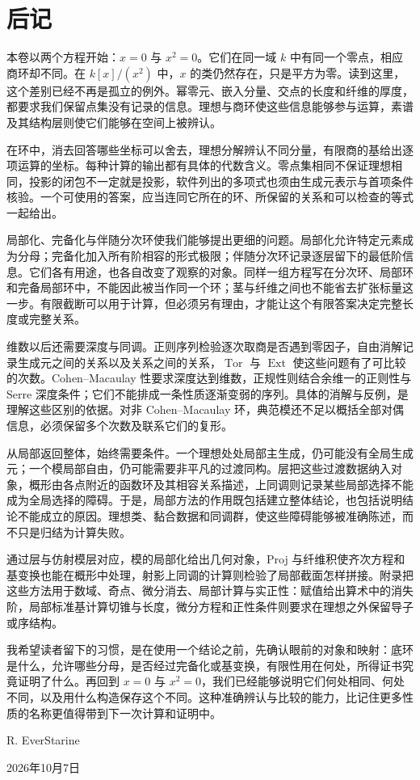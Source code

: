 \chapter*{后记}

本卷以两个方程开始：\(x=0\) 与 \(x^2=0\)。它们在同一域 \(k\) 中有同一个零点，相应商环却不同。在 \(k[x]/(x^2)\) 中，\(x\) 的类仍然存在，只是平方为零。读到这里，这个差别已经不再是孤立的例外。幂零元、嵌入分量、交点的长度和纤维的厚度，都要求我们保留点集没有记录的信息。理想与商环使这些信息能够参与运算，素谱及其结构层则使它们能够在空间上被辨认。

\ProseParagraphBreak
在环中，消去回答哪些坐标可以舍去，理想分解辨认不同分量，有限商的基给出逐项运算的坐标。每种计算的输出都有具体的代数含义。零点集相同不保证理想相同，投影的闭包不一定就是投影，软件列出的多项式也须由生成元表示与首项条件核验。一个可使用的答案，应当连同它所在的环、所保留的关系和可以检查的等式一起给出。

\ProseParagraphBreak
局部化、完备化与伴随分次环使我们能够提出更细的问题。局部化允许特定元素成为分母；完备化加入所有阶相容的形式极限；伴随分次环记录逐层留下的最低阶信息。它们各有用途，也各自改变了观察的对象。同样一组方程写在分次环、局部环和完备局部环中，不能因此被当作同一个环；茎与纤维之间也不能省去扩张标量这一步。有限截断可以用于计算，但必须另有理由，才能让这个有限答案决定完整长度或完整关系。

\ProseParagraphBreak
维数以后还需要深度与同调。正则序列检验逐次取商是否遇到零因子，自由消解记录生成元之间的关系以及关系之间的关系，\(\operatorname{Tor}\) 与 \(\operatorname{Ext}\) 使这些问题有了可比较的次数。Cohen--Macaulay 性要求深度达到维数，正规性则结合余维一的正则性与 Serre 深度条件；它们不能排成一条性质逐渐变弱的序列。具体的消解与反例，是理解这些区别的依据。对非 Cohen--Macaulay 环，典范模还不足以概括全部对偶信息，必须保留多个次数及联系它们的复形。

\ProseParagraphBreak
从局部返回整体，始终需要条件。一个理想处处局部主生成，仍可能没有全局生成元；一个模局部自由，仍可能需要非平凡的过渡同构。层把这些过渡数据纳入对象，概形由各点附近的函数环及其相容关系描述，上同调则记录某些局部选择不能成为全局选择的障碍。于是，局部方法的作用既包括建立整体结论，也包括说明结论不能成立的原因。理想类、黏合数据和同调群，使这些障碍能够被准确陈述，而不只是归结为计算失败。

\ProseParagraphBreak
通过层与仿射模层对应，模的局部化给出几何对象，Proj 与纤维积使齐次方程和基变换也能在概形中处理，射影上同调的计算则检验了局部截面怎样拼接。附录把这些方法用于数域、奇点、微分消去、局部计算与实正性：赋值给出算术中的消失阶，局部标准基计算切锥与长度，微分方程和正性条件则要求在理想之外保留导子或序结构。

\ProseParagraphBreak
我希望读者留下的习惯，是在使用一个结论之前，先确认眼前的对象和映射：底环是什么，允许哪些分母，是否经过完备化或基变换，有限性用在何处，所得证书究竟证明了什么。再回到 \(x=0\) 与 \(x^2=0\)，我们已经能够说明它们何处相同、何处不同，以及用什么构造保存这个不同。这种准确辨认与比较的能力，比记住更多性质的名称更值得带到下一次计算和证明中。

\bigskip
\begin{flushright}
	R. EverStarine

	2026年10月7日
\end{flushright}
